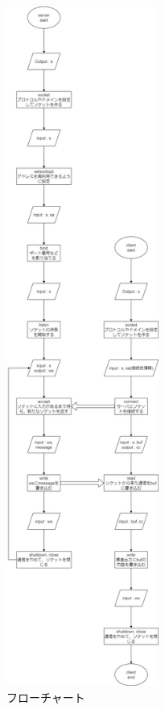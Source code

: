 \documentclass[a4paper,10pt]{jsarticle}
\begin{document}
\begin{figure}[H]
  \centering
  \includegraphics[width=5cm]{./01.png}
  \caption{フローチャート}
  \label{フローチャート}
\end{figure}



\end{document}
